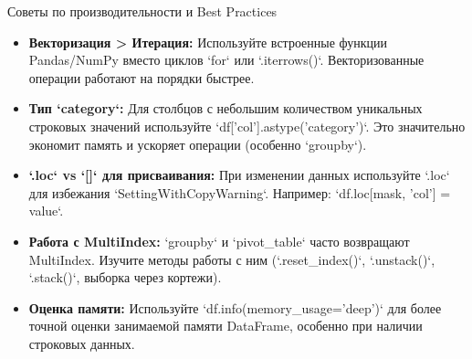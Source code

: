 \begin{alerttextbox}{Советы по производительности и Best Practices}
\begin{itemize}[leftmargin=*]
    \item \textbf{Векторизация > Итерация:} Используйте встроенные функции Pandas/NumPy вместо циклов `for` или `.iterrows()`. Векторизованные операции работают на порядки быстрее.
    \item \textbf{Тип `category`:} Для столбцов с небольшим количеством уникальных строковых значений используйте `df['col'].astype('category')`. Это значительно экономит память и ускоряет операции (особенно `groupby`).
    \item \textbf{`.loc` vs `[]` для присваивания:} При изменении данных используйте `.loc` для избежания `SettingWithCopyWarning`. Например: `df.loc[mask, 'col'] = value`.
    \item \textbf{Работа с MultiIndex:} `groupby` и `pivot\_table` часто возвращают MultiIndex. Изучите методы работы с ним (`.reset\_index()`, `.unstack()`, `.stack()`, выборка через кортежи).
    \item \textbf{Оценка памяти:} Используйте `df.info(memory\_usage='deep')` для более точной оценки занимаемой памяти DataFrame, особенно при наличии строковых данных.
\end{itemize}
\end{alerttextbox}